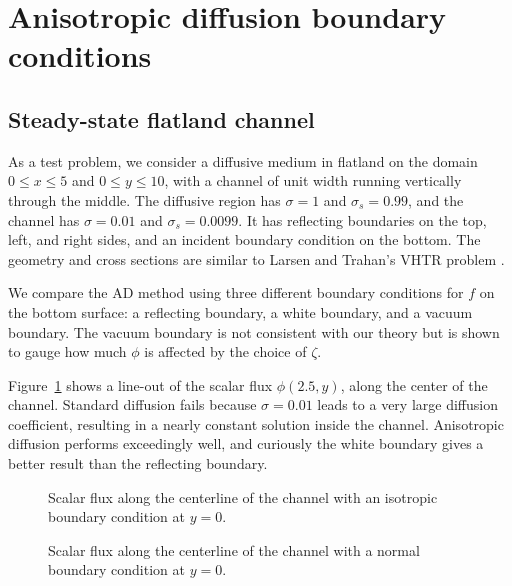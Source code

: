 \section{Anisotropic diffusion boundary conditions}

\subsection{Steady-state flatland channel}
As a test problem, we consider a diffusive medium in flatland on
the domain $0
\le x \le 5$ and $0 \le y \le 10$, with a channel of unit width running
vertically through the middle. The diffusive region has $\sigma=1$ and
$\sigma_s=0.99$, and the channel has $\sigma=0.01$ and $\sigma_s=0.0099$. It has
reflecting boundaries on the top, left, and right sides, and an incident
boundary condition on the bottom. The geometry and cross sections are similar to Larsen
and Trahan's VHTR problem \cite{Lar2009c}.

We compare the AD method using three different boundary conditions for $f$ on
the bottom surface: a reflecting boundary, a white boundary, and a vacuum
boundary. The vacuum boundary is not consistent with our theory but
is shown to gauge how much $\phi$ is affected by the choice of $\zeta$.

Figure~\ref{fig:bcChannelIsotropic} shows a line-out of the scalar flux
$\phi(2.5,y)$, along the center
of the channel. Standard diffusion fails because $\sigma=0.01$ leads to a very
large diffusion coefficient, resulting in a nearly constant solution inside the
channel. Anisotropic diffusion performs exceedingly well, and curiously the
white boundary gives a better result than the reflecting boundary.

\begin{figure}[htb]
  \centering\small
  \hspace{-.5in}
  
  \hspace{-.5in}
  \caption{Scalar flux along the centerline of the channel with an isotropic
  boundary condition at $y=0$.}
  \label{fig:bcChannelIsotropic}
\end{figure}

\begin{figure}[htb]
  \centering\small
  \hspace{-.5in}
  
  \hspace{-.5in}
  \caption{Scalar flux along the centerline of the channel with a normal
  boundary condition at $y=0$.}
  \label{fig:bcChannelDelta}
\end{figure}

